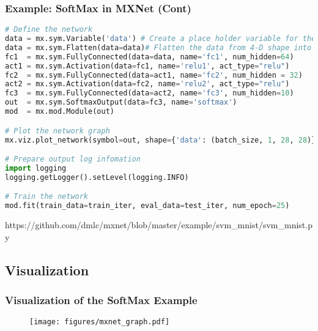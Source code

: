 \begin{frame}[fragile]
  \MyLogo
  \frametitle{Example: SoftMax in MXNet (Cont)}  

\ContinueLineNumber
\scriptsize{
\begin{lstlisting}[language=python]
# Define the network
data = mx.sym.Variable('data') # Create a place holder variable for the input data
data = mx.sym.Flatten(data=data)# Flatten the data from 4-D shape into 2-D
fc1  = mx.sym.FullyConnected(data=data, name='fc1', num_hidden=64) 
act1 = mx.sym.Activation(data=fc1, name='relu1', act_type="relu")
fc2  = mx.sym.FullyConnected(data=act1, name='fc2', num_hidden = 32)
act2 = mx.sym.Activation(data=fc2, name='relu2', act_type="relu")
fc3  = mx.sym.FullyConnected(data=act2, name='fc3', num_hidden=10)
out  = mx.sym.SoftmaxOutput(data=fc3, name='softmax')
mod  = mx.mod.Module(out)

# Plot the network graph
mx.viz.plot_network(symbol=out, shape={'data': (batch_size, 1, 28, 28)}).view()

# Prepare output log infomation
import logging
logging.getLogger().setLevel(logging.INFO)

# Train the network
mod.fit(train_data=train_iter, eval_data=test_iter, num_epoch=25)

\end{lstlisting}
}

\vskip 50pt

\begin{center}
{\color{red}\scriptsize
https://github.com/dmlc/mxnet/blob/master/example/svm\_mnist/svm\_mnist.py
}
\end{center}

\end{frame}


\subsection{Visualization}

\begin{frame}
	\MyLogo
	\frametitle{Visualization of the SoftMax Example}  

\vskip -5pt
\begin{figure}[htbp] 
	\texttt{[image: figures/mxnet\_graph.pdf]} 
\end{figure}
	
\end{frame}